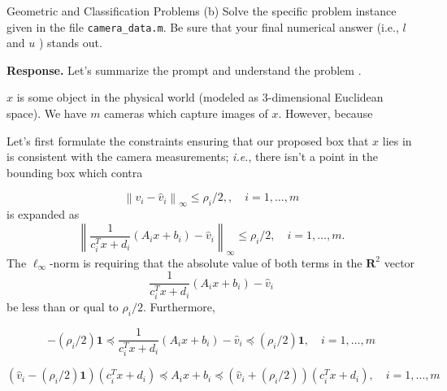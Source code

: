 \begin{chapter}{Geometric and Classification Problems}
\vspace{0.1cm}
\noindent (b) Solve the specific problem instance given in the file \lstinline|camera_data.m|. Be sure that your final numerical answer (i.e., $l$ and $u$ ) stands out.

\vspace{0.1cm}
\noindent \textbf{Response.} Let's summarize the prompt and understand the problem .

$x$ is some object in the physical world (modeled as 3-dimensional Euclidean space). We have $m$ cameras which capture images
of $x$. However, because

Let's first formulate the constraints ensuring that our proposed box that $x$ lies in is consistent with the camera measurements;
\textit{i.e.}, there isn't a point in the bounding box which contra

\[\left\lVert v_i - \hat{v}_i \right\rVert_{\infty} \le \rho_i / 2, , \quad i = 1, \ldots, m\]
is expanded as 
\[\left\lVert \frac{1}{c_i^T x+d_i}\left(A_i x+b_i\right) - \hat{v}_i \right\rVert_{\infty} \le \rho_i/2, \quad i = 1, \ldots, m.\]
The $\ell_{\infty}$-norm is requiring that the absolute value of both terms in the $\mathbf{R}^2$ vector
\[\frac{1}{c_i^T x+d_i}\left(A_i x+b_i\right) - \hat{v}_i\]
be less than or qual to $\rho_i/2$. Furthermore,

\[-(\rho_i/2) \bm{1} \preceq \frac{1}{c_i^T x+d_i}\left(A_i x+b_i\right) - \hat{v}_i \preceq (\rho_i/2) \bm{1}, \quad i = 1, \ldots, m\]

\[(\hat{v}_i - (\rho_i/2) \bm{1})(c_i^T x + d_i) \preceq A_i x + b_i \preceq (\hat{v}_i + (\rho_i/2))(c_i^Tx + d_i), \quad i = 1, \ldots, m\]

\end{chapter}